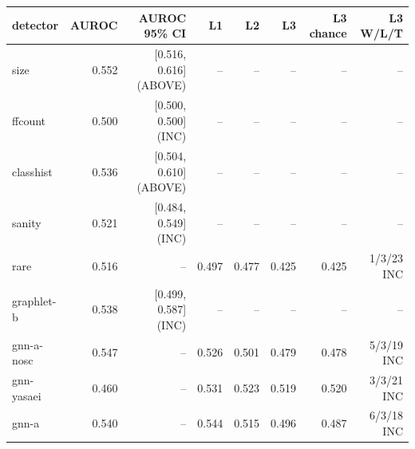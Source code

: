 \begin{tabular}{lrrrrrrr}
\hline
detector & AUROC & AUROC 95\% CI & L1 & L2 & L3 & L3 chance & L3 W/L/T \\
\hline
size & 0.552 & [0.516, 0.616] (ABOVE) & -- & -- & -- & -- & -- \\
ffcount & 0.500 & [0.500, 0.500] (INC) & -- & -- & -- & -- & -- \\
classhist & 0.536 & [0.504, 0.610] (ABOVE) & -- & -- & -- & -- & -- \\
sanity & 0.521 & [0.484, 0.549] (INC) & -- & -- & -- & -- & -- \\
rare & 0.516 & -- & 0.497 & 0.477 & 0.425 & 0.425 & 1/3/23 INC \\
graphlet{-}b & 0.538 & [0.499, 0.587] (INC) & -- & -- & -- & -- & -- \\
gnn{-}a{-}nosc & 0.547 & -- & 0.526 & 0.501 & 0.479 & 0.478 & 5/3/19 INC \\
gnn{-}yasaei & 0.460 & -- & 0.531 & 0.523 & 0.519 & 0.520 & 3/3/21 INC \\
gnn{-}a & 0.540 & -- & 0.544 & 0.515 & 0.496 & 0.487 & 6/3/18 INC \\
\hline
\end{tabular}

